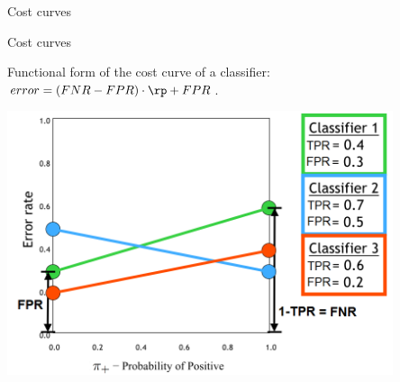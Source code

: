 \documentclass[11pt,compress,t,notes=noshow, xcolor=table]{beamer}
\begin{document}
\begin{vbframe}{Cost curves}

\end{vbframe}


\begin{vbframe}{Cost curves}


Functional form of the cost curve of a classifier: 
$error = (FNR - FPR) \cdot \rp + FPR$.

\begin{center}
  \includegraphics[width=0.85\textwidth]{figure_man/cost-curves-3.png}
\end{center}

\end{vbframe}

\end{document}
